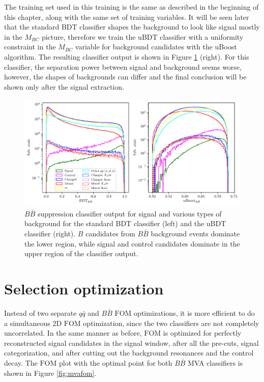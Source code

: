 The training set used in this training is the same as described in the beginning of this chapter, along with the same set of training variables. It will be seen later that the standard BDT classifier shapes the background to look like signal mostly in the $M_{BC}$ picture, therefore we train the uBDT classifier with a uniformity constraint in the $M_{BC}$ variable for background candidates with the uBoost algorithm. The resulting classifier output is shown in Figure \ref{fig:bbmva} (right). For this classifier, the separation power between signal and background seems worse, however, the shapes of backgrounds can differ and the final conclusion will be shown only after the signal extraction.

\begin{figure}[H]
\centering
\captionsetup{width=0.8\linewidth}
\includegraphics[width=\linewidth]{fig/bb_BDT}
\caption{$B\bar B$ suppression classifier output for signal and various types of background for the standard BDT classifier (left) and the uBDT classifier (right). $B$ candidates from $B\bar B$ background events dominate the lower region, while signal and control candidates dominate in the upper region of the classifier output.}
\label{fig:bbmva}
\end{figure}

\section{Selection optimization}\label{sec:selection-optimization}

Instead of two separate $q \bar q$ and $B \bar B$ $\mathrm{FOM}$ optimizations, it is more efficient to do a simultaneous 2D $\mathrm{FOM}$ optimization, since the two classifiers are not completely uncorrelated. In the same manner as before, $\mathrm{FOM}$ is optimized for perfectly reconstructed signal candidates in the signal window, after all the pre-cuts, signal categorization, and after cutting out the background resonances and the control decay. The $\mathrm{FOM}$ plot with the optimal point for both $B \bar B$ MVA classifiers is shown in Figure \ref{fig:mvafom}.

